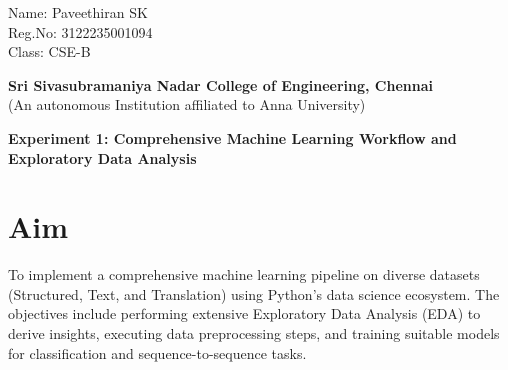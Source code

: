 \documentclass[11pt]{article}
\begin{document}
{
\raggedleft
Name: Paveethiran SK\\
Reg.No: 3122235001094\\
Class: CSE-B\\
}

\begin{center}
    \large \textbf{Sri Sivasubramaniya Nadar College of Engineering, Chennai} \\
    (An autonomous Institution affiliated to Anna University) \\
    \vspace{0.3cm}
\end{center}

\begin{table}[H] 
\renewcommand{\arraystretch}{1.5}
\end{table}

\begin{center}
 \textbf{Experiment 1: Comprehensive Machine Learning Workflow and Exploratory Data Analysis}
\end{center}
\vspace{0.5cm}

\section{Aim}
To implement a comprehensive machine learning pipeline on diverse datasets (Structured, Text, and Translation) using Python's data science ecosystem. The objectives include performing extensive Exploratory Data Analysis (EDA) to derive insights, executing data preprocessing steps, and training suitable models for classification and sequence-to-sequence tasks.
\end{document}

